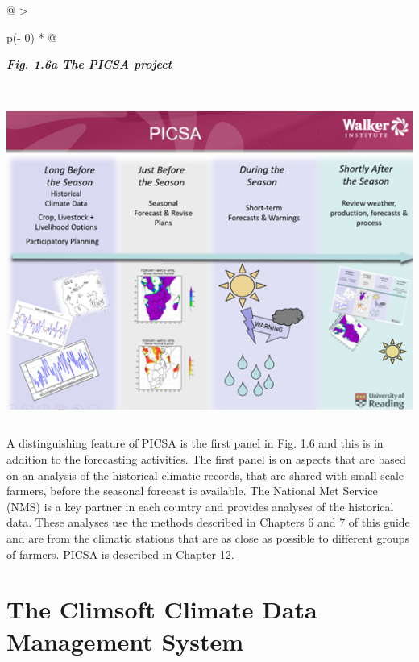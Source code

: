 \documentclass[
  letterpaper,
  DIV=11,
  numbers=noendperiod]{scrreprt}
\begin{document}
\begin{longtable}[]{@{}
  >{\raggedright\arraybackslash}p{(\columnwidth - 0\tabcolsep) * }@{}}
\toprule\noalign{}
\begin{minipage}[b]{\linewidth}\raggedright
\textbf{\emph{Fig. 1.6a The PICSA project}}
\end{minipage} \\
\midrule\noalign{}
\endhead
\bottomrule\noalign{}
\endlastfoot
\includegraphics[width=5.64347in,height=4.15038in]{figures/Fig1.6a.png} \\
\end{longtable}

A distinguishing feature of PICSA is the first panel in Fig. 1.6 and
this is in addition to the forecasting activities. The first panel is on
aspects that are based on an analysis of the historical climatic
records, that are shared with small-scale farmers, before the seasonal
forecast is available. The National Met Service (NMS) is a key partner
in each country and provides analyses of the historical data. These
analyses use the methods described in Chapters 6 and 7 of this guide and
are from the climatic stations that are as close as possible to
different groups of farmers. PICSA is described in Chapter 12.

\section{The Climsoft Climate Data Management
System}\label{the-climsoft-climate-data-management-system}
\end{document}

